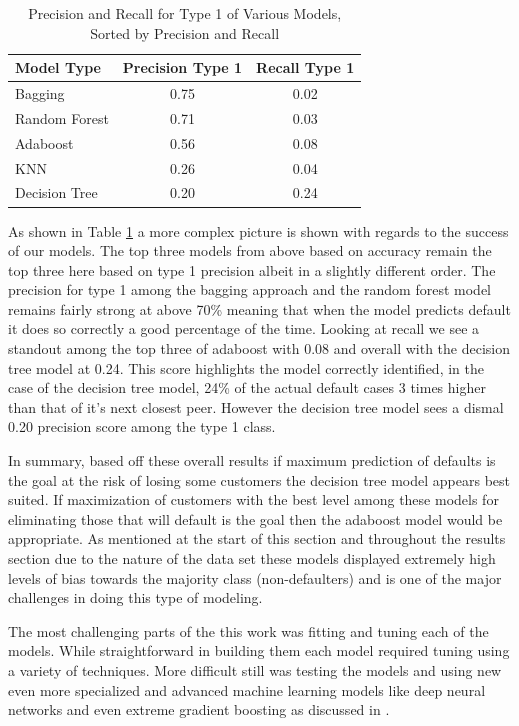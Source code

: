 \documentclass[12pt]{article}
\begin{document}
\begin{table}[hbt!]
    \centering
    \caption{Precision and Recall for Type 1 of Various Models, Sorted by Precision and Recall}
    \label{tab:precision_recall}
    \begin{tabular}{lcc}
        \toprule
        Model Type      & Precision Type 1 & Recall Type 1 \\
        \midrule
        Bagging         & 0.75 & 0.02 \\
        Random Forest   & 0.71 & 0.03 \\
        Adaboost        & 0.56 & 0.08 \\
        KNN             & 0.26 & 0.04 \\
        Decision Tree   & 0.20 & 0.24 \\
        \bottomrule
    \end{tabular}
    \label{table:type1finalresults}
\end{table}

As shown in Table \ref{table:type1finalresults} a more complex picture is shown with regards to the success of our models. The top three models from above based on accuracy remain the top three here based on type 1 precision albeit in a slightly different order. The precision for type 1 among the bagging approach and the random forest model remains fairly strong at above 70\% meaning that when the model predicts default it does so correctly a good percentage of the time. Looking at recall we see a standout among the top three of adaboost with 0.08 and overall with the decision tree model at 0.24. This score highlights the model correctly identified, in the case of the decision tree model, 24\% of the actual default cases 3 times higher than that of it's next closest peer. However the decision tree model sees a dismal 0.20 precision score among the type 1 class.

In summary, based off these overall results if maximum prediction of defaults is the goal at the risk of losing some customers the decision tree model appears best suited. If maximization of customers with the best level among these models for eliminating those that will default is the goal then the adaboost model would be appropriate. As mentioned at the start of this section and throughout the results section due to the nature of the data set these models displayed extremely high levels of bias towards the majority class (non-defaulters) and is one of the major challenges in doing this type of modeling.

The most challenging parts of the this work was fitting and tuning each of the models. While straightforward in building them each model required tuning using a variety of techniques. More difficult still was testing the models and using new even more specialized and advanced machine learning models like deep neural networks and even extreme gradient boosting as discussed in \citet{lai2020loan}. 
\end{document}

